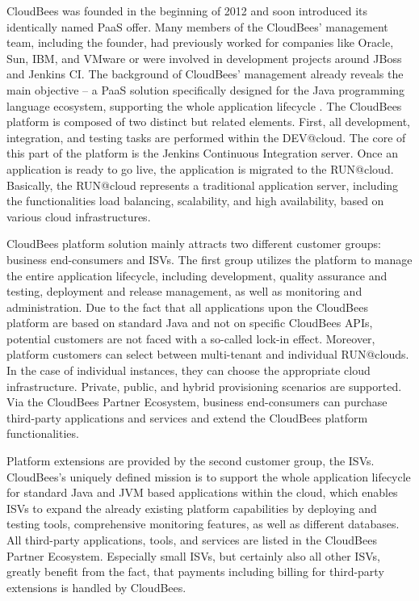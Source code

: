 CloudBees was founded in the beginning of 2012 and soon introduced its identically named \ac{PaaS} offer. Many members of the CloudBees' management team, including the founder, had previously worked for companies like Oracle, Sun, IBM, and VMware or were involved in development projects around JBoss and Jenkins CI. The background of CloudBees' management already reveals the main objective -- a \ac{PaaS} solution specifically designed for the Java programming language ecosystem, supporting the whole application lifecycle \citep{CloudBees2013}. The CloudBees platform is composed of two distinct but related elements. First, all development, integration, and testing tasks are performed within the DEV@cloud. The core of this part of the platform is the Jenkins Continuous Integration server. Once an application is ready to go live, the application is migrated to the RUN@cloud. Basically, the RUN@cloud represents a traditional application server, including the functionalities load balancing, scalability, and high availability, based on various cloud infrastructures.

CloudBees platform solution mainly attracts two different customer groups: business end-consumers and \acp{ISV}. The first group utilizes the platform to manage the entire application lifecycle, including development, quality assurance and testing, deployment and release management, as well as monitoring and administration. Due to the fact that all applications upon the CloudBees platform are based on standard Java and not on specific CloudBees \acp{API}, potential customers are not faced with a so-called lock-in effect. Moreover, platform customers can select between multi-tenant and individual RUN@clouds. In the case of individual instances, they can choose the appropriate cloud infrastructure. Private, public, and hybrid provisioning scenarios are supported. Via the CloudBees Partner Ecosystem, business end-consumers can purchase third-party applications and services and extend the CloudBees platform functionalities. 

Platform extensions are provided by the second customer group, the \acp{ISV}. CloudBees's uniquely defined mission is to support the whole application lifecycle for standard Java and \ac{JVM} based applications within the cloud, which enables \acp{ISV} to expand the already existing platform capabilities by deploying and testing tools, comprehensive monitoring features, as well as different databases. All third-party applications, tools, and services are listed in the CloudBees Partner Ecosystem. Especially small \acp{ISV}, but certainly also all other \acp{ISV}, greatly benefit from the fact, that payments including billing for third-party extensions is handled by CloudBees.

